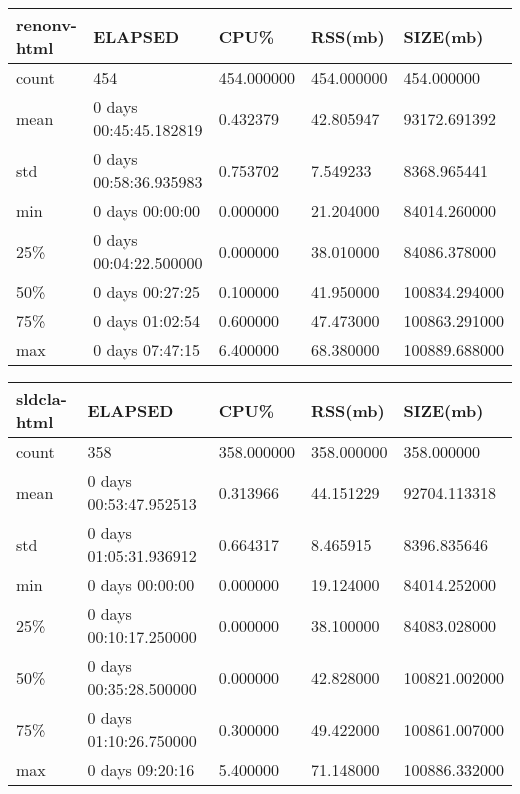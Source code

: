 \documentclass{article}
\begin{document}
\begin{table}[H]
\begin{tabular}{|l|l|l|l|l|}
\hline renonv-html & ELAPSED & CPU\% & RSS(mb) & SIZE(mb) \\
\hline count & 454 & 454.000000 & 454.000000 & 454.000000 \\
\hline mean & 0 days 00:45:45.182819 & 0.432379 & 42.805947 & 93172.691392 \\
\hline std & 0 days 00:58:36.935983 & 0.753702 & 7.549233 & 8368.965441 \\
\hline min & 0 days 00:00:00 & 0.000000 & 21.204000 & 84014.260000 \\
\hline 25\% & 0 days 00:04:22.500000 & 0.000000 & 38.010000 & 84086.378000 \\
\hline 50\% & 0 days 00:27:25 & 0.100000 & 41.950000 & 100834.294000 \\
\hline 75\% & 0 days 01:02:54 & 0.600000 & 47.473000 & 100863.291000 \\
\hline max & 0 days 07:47:15 & 6.400000 & 68.380000 & 100889.688000 \\
\hline
\end{tabular}
\label{TABLE-SessionSize-renonv-html}
\end{table}
\begin{table}[H]
\begin{tabular}{|l|l|l|l|l|}
\hline sldcla-html & ELAPSED & CPU\% & RSS(mb) & SIZE(mb) \\
\hline count & 358 & 358.000000 & 358.000000 & 358.000000 \\
\hline mean & 0 days 00:53:47.952513 & 0.313966 & 44.151229 & 92704.113318 \\
\hline std & 0 days 01:05:31.936912 & 0.664317 & 8.465915 & 8396.835646 \\
\hline min & 0 days 00:00:00 & 0.000000 & 19.124000 & 84014.252000 \\
\hline 25\% & 0 days 00:10:17.250000 & 0.000000 & 38.100000 & 84083.028000 \\
\hline 50\% & 0 days 00:35:28.500000 & 0.000000 & 42.828000 & 100821.002000 \\
\hline 75\% & 0 days 01:10:26.750000 & 0.300000 & 49.422000 & 100861.007000 \\
\hline max & 0 days 09:20:16 & 5.400000 & 71.148000 & 100886.332000 \\
\hline
\end{tabular}
\label{TABLE-SessionSize-sldcla-html}
\end{table}
\end{document}
